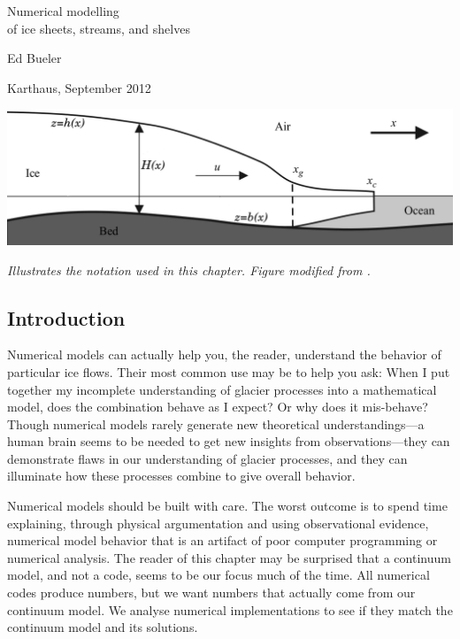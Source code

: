 \documentclass[titlepage,a4paper,final,12pt]{scrartcl}
\begin{document}
\graphicspath{{../photos/}{../pdffigs/}}


\begin{titlepage}

  \begin{center}
    {\Large{} Numerical modelling \\ of ice sheets, streams, and shelves}
    \vspace{0.5cm}

    {\large Ed Bueler}
    \vspace{1cm}

    Karthaus, September 2012

    \vfill
    
    \includegraphics[width=6.0in]{flowline}
  
    \scriptsize \emph{Illustrates the notation used in this chapter.  Figure modified from \cite{SchoofMarine1}.} \normalsize
    
    \vspace{2.0in}
  \end{center}
\end{titlepage}

\clearpage\newpage

\setcounter{section}{1}
\subsection{Introduction}

Numerical models can actually help you, the reader, understand the behavior of particular ice flows.  Their most common use may be to help you ask: When I put together my incomplete understanding of glacier processes into a mathematical model, does the combination behave as I expect?  Or why does it mis-behave?  Though numerical models rarely generate new theoretical understandings---a human brain seems to be needed to get new insights from observations---they can demonstrate flaws in our understanding of glacier processes, and they can illuminate how these processes combine to give overall behavior.

Numerical models should be built with care.  The worst outcome is to spend time explaining, through physical argumentation and using observational evidence, numerical model behavior that is an artifact of poor computer programming or numerical analysis.  The reader of this chapter may be surprised that a continuum model, and not a code, seems to be our focus much of the time.  All numerical codes produce numbers, but we want numbers that actually come from our continuum model.  We analyse numerical implementations to see if they match the continuum model and its solutions.
\end{document}
